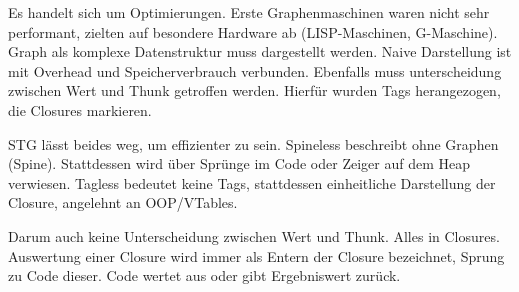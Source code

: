 Es handelt sich um Optimierungen.
Erste Graphenmaschinen waren nicht sehr performant, zielten auf besondere Hardware ab (LISP-Maschinen, G-Maschine).
Graph als komplexe Datenstruktur muss dargestellt werden.
Naive Darstellung ist mit Overhead und Speicherverbrauch verbunden.
Ebenfalls muss unterscheidung zwischen Wert und Thunk getroffen werden.
Hierfür wurden Tags herangezogen, die Closures markieren.

STG lässt beides weg, um effizienter zu sein.
Spineless beschreibt ohne Graphen (Spine).
Stattdessen wird über Sprünge im Code oder Zeiger auf dem Heap verwiesen.
Tagless bedeutet keine Tags, stattdessen einheitliche Darstellung der Closure, angelehnt an OOP/VTables.


Darum auch keine Unterscheidung zwischen Wert und Thunk. Alles in Closures.
Auswertung einer Closure wird immer als Entern der Closure bezeichnet, Sprung zu Code dieser.
Code wertet aus oder gibt Ergebniswert zurück.



